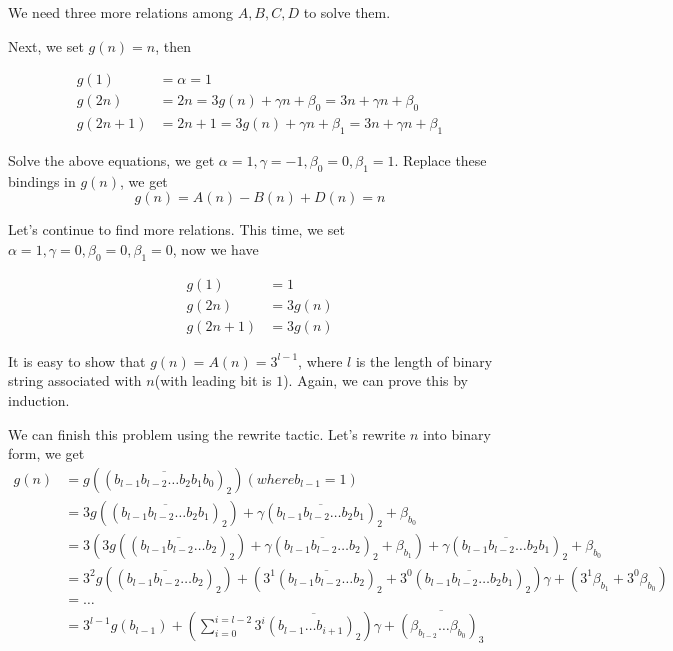 \documentclass{article}
\begin{document}
We need three more relations among $A, B, C, D$ to solve them.

Next, we set $g(n)=n$, then

\begin{equation}
    \begin{split}
        g(1) & = \alpha = 1 \\
        g(2n) & = 2n = 3g(n) + \gamma n + \beta_0 = 3n + \gamma n + \beta_0 \\
        g(2n+1) & = 2n + 1 = 3g(n) + \gamma n + \beta_1 = 3n + \gamma n + \beta_1
    \end{split}
\end{equation}

Solve the above equations, we get $\alpha = 1, \gamma = -1, \beta_0 = 0,  \beta_1 = 1$. Replace these bindings in $g(n)$, we get
\begin{equation}
    g(n) = A(n) - B(n) + D(n) = n
\end{equation}

Let's continue to find more relations. This time, we set $\alpha = 1, \gamma = 0, \beta_0 = 0,  \beta_1 = 0$, now we have

\begin{equation}
    \begin{split}
        g(1) & = 1 \\
        g(2n) & = 3g(n) \\
        g(2n+1) & = 3g(n)
    \end{split}
\end{equation}

It is easy to show that $g(n) = A(n) = 3^{l-1}$, where $l$ is the length of binary string associated with $n$(with leading bit is $1$). Again, we can prove this by induction.

We can finish this problem using the rewrite tactic. Let's rewrite $n$ into binary form, we get
\begin{equation}
    \begin{split}
        g(n) & = g((\overline{b_{l-1}b_{l-2}\dots b_2b_1b_0})_2) (where b_{l-1}=1)\\
             & = 3g((\overline{b_{l-1}b_{l-2}\dots b_2b_1})_2) + \gamma (\overline{b_{l-1}b_{l-2}\dots b_2b_1})_2 + \beta_{b_0}\\
             & = 3(3g((\overline{b_{l-1}b_{l-2}\dots b_2})_2) + \gamma (\overline{b_{l-1}b_{l-2}\dots b_2})_2 + \beta_{b_1}) + \gamma (\overline{b_{l-1}b_{l-2}\dots b_2b_1})_2 + \beta_{b_0}\\
             & = 3^2g((\overline{b_{l-1}b_{l-2}\dots b_2})_2) + (3^1(\overline{b_{l-1}b_{l-2}\dots b_2})_2 + 3^0(\overline{b_{l-1}b_{l-2}\dots b_2b_1})_2)\gamma + (3^1\beta_{b_1}+3^0\beta_{b_0})\\
             & = \dots\\
             & = 3^{l-1}g(b_{l-1}) + (\sum_{i=0}^{i=l-2}3^{i}\overline{(b_{l-1}\dots b_{i+1})_2})\gamma + \overline{(\beta_{b_{l-2}}\dots \beta_{b_0})_3}
    \end{split}
\end{equation}
\end{document}

